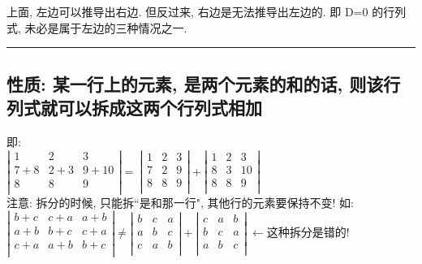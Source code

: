 \documentclass[UTF8]{ctexart}
\begin{document}
	上面, 左边可以推导出右边. 但反过来, 右边是无法推导出左边的. 即 D=0 的行列式, 未必是属于左边的三种情况之一. \\
	
	\hrule
	
	\subsection{性质: 某一行上的元素, 是两个元素的和的话, 则该行列式就可以拆成这两个行列式相加}
	即:\\
	$
	\left| \begin{matrix}
		1&		2&		3\\
		7+8&		2+3&		9+10\\
		8&		8&		9\\
	\end{matrix} \right|=\ \left| \begin{matrix}
		1&		2&		3\\
		7&		2&		9\\
		8&		8&		9\\
	\end{matrix} \right|+\left| \begin{matrix}
		1&		2&		3\\
		8&		3&		10\\
		8&		8&		9\\
	\end{matrix} \right|
	$\\
	
	注意: 拆分的时候, 只能拆``是和那一行", 其他行的元素要保持不变! 如:\\	
	$
	\left| \begin{matrix}
		b+c&		c+a&		a+b\\
		a+b&		b+c&		c+a\\
		c+a&		a+b&		b+c\\
	\end{matrix} \right|\ne \left| \begin{matrix}
		b&		c&		a\\
		a&		b&		c\\
		c&		a&		b\\
	\end{matrix} \right|+\left| \begin{matrix}
		c&		a&		b\\
		b&		c&		a\\
		a&		b&		c\\
	\end{matrix} \right|\ ←\text{这种拆分是错的!}
	$\\
	
\end{document}
